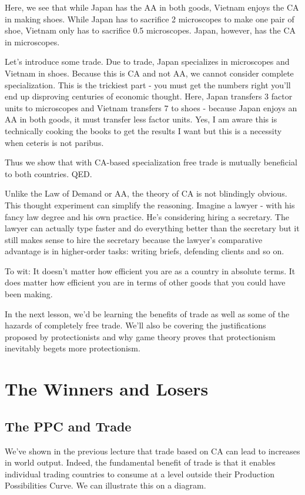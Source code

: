 Here, we see that while Japan has the AA in both goods, Vietnam enjoys the CA in making shoes. While Japan has to sacrifice 2 microscopes to make one pair of shoe, Vietnam only has to sacrifice 0.5 microscopes. Japan, however, has the CA in microscopes.

Let's introduce some trade. Due to trade, Japan specializes in microscopes and Vietnam in shoes. Because this is CA and not AA, we cannot consider complete specialization. This is the trickiest part - you must get the numbers right you'll end up disproving centuries of economic thought. Here, Japan transfers 3 factor units to microscopes and Vietnam transfers 7 to shoes - because Japan enjoys an AA in both goods, it must transfer less factor units. Yes, I am aware this is technically cooking the books to get the results I want but this is a necessity when ceteris is not paribus.

Thus we show that with CA-based specialization free trade is mutually beneficial to both countries. QED.

Unlike the Law of Demand or AA, the theory of CA is not blindingly obvious. This thought experiment can simplify the reasoning. Imagine a lawyer - with his fancy law degree and his own practice. He's considering hiring a secretary. The lawyer can actually type faster and do everything better than the secretary but it still makes sense to hire the secretary because the lawyer's comparative advantage is in higher-order tasks: writing briefs, defending clients and so on. 

To wit: It doesn't matter how efficient you are as a country in absolute terms. It does matter how efficient you are in terms of other goods that you could have been making.

In the next lesson, we'd be learning the benefits of trade as well as some of the hazards of completely free trade. We'll also be covering the justifications proposed by protectionists and why game theory proves that protectionism inevitably begets more protectionism.
\section{The Winners and Losers}
\subsection{The PPC and Trade}
We've shown in the previous lecture that trade based on CA can lead to increases in world output. Indeed, the fundamental benefit of trade is that it enables individual trading countries to consume at a level outside their Production Possibilities Curve. We can illustrate this on a diagram.

